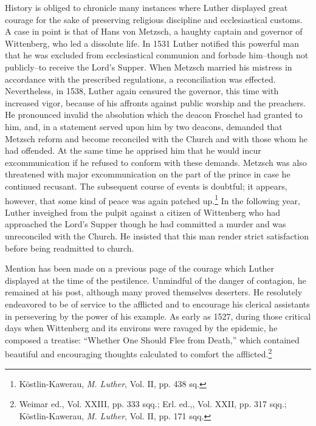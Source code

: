 History is obliged to chronicle many instances where Luther displayed
great courage for the sake of preserving religious discipline
and ecclesiastical customs. A case in point is that of Hans von Metzsch,
a haughty captain and governor of Wittenberg, who led a dissolute
life. In 1531 Luther notified this powerful man that he was excluded
from ecclesiastical communion and forbade him--though not publicly--to
receive the Lord’s Supper. When Metzsch married his
mistress in accordance with the prescribed regulations, a reconciliation
was effected. Nevertheless, in 1538, Luther again censured the
governor, this time with increased vigor, because of his affronts
against public worship and the preachers. He pronounced invalid the
absolution which the deacon Froschel had granted to him, and, in a
statement served upon him by two deacons, demanded that Metzsch
reform and become reconciled with the Church and with those whom
he had offended. At the same time he apprised him that he would
incur excommunication if he refused to conform with these demands.
Metzsch was also threatened with major excommunication on the part
of the prince in case he continued recusant. The subsequent course of
events is doubtful; it appears, however, that some kind of peace was
again patched up.\footnote{Köstlin-Kawerau, \textit{M. Luther}, Vol. II, pp. 438 sq.}
In the following year, Luther inveighed from
the pulpit against a citizen of Wittenberg who had approached the
Lord’s Supper though he had committed a murder and was unreconciled
with the Church. He insisted that this man render strict satisfaction
before being readmitted to church.

Mention has been made on a previous page of the courage which
Luther displayed at the time of the pestilence. Unmindful of the
danger of contagion, he remained at his post, although many proved
themselves deserters. He resolutely endeavored to be of service to the
afflicted and to encourage his clerical assistants in persevering by the
power of his example. As early as 1527, during those critical days
when Wittenberg and its environs were ravaged by the epidemic, he
composed a treatise: “Whether One Should Flee from Death,” which
contained beautiful and encouraging thoughts calculated to comfort
the afflicted.\footnote
{Weimar ed., Vol. XXIII, pp. 333 sqq.; Erl. ed.,, Vol. XXII, pp. 317 sqq.;
Köstlin-Kawerau, \textit{M. Luther}, Vol. II, pp. 171 sqq.}


